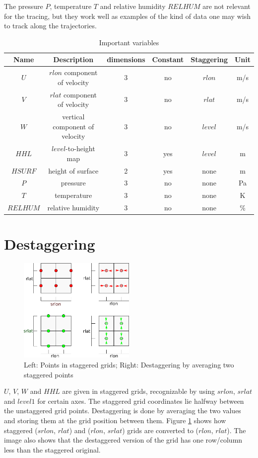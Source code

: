 The pressure $P$, temperature $T$ and relative humidity $RELHUM$ are not relevant for the tracing, but they work well as examples of the kind of data one may wish to track along the trajectories.

\begin{table}
\centering
\begin{tabular}{|c|c|c|c|c|c|}
\hline
Name & Description & dimensions & Constant & Staggering & Unit \\ \hline
$U$ & $rlon$ component of velocity & 3 & no & $rlon$ & m/s \\ \hline
$V$ & $rlat$ component of velocity & 3 & no & $rlat$ & m/s \\ \hline
$W$ & vertical component of velocity & 3 & no & $level$ & m/s \\ \hline
$HHL$ & $level$-to-height map & 3 & yes & $level$ & m \\ \hline
$HSURF$ & height of surface & 2 & yes & none & m \\ \hline
$P$ & pressure & 3 & no & none & Pa \\ \hline
$T$ & temperature & 3 & no & none & K \\ \hline
$RELHUM$ & relative humidity & 3 & no & none & \% \\ \hline
\end{tabular}
\caption{Important variables}
\label{tab:variables}
\end{table}

\section{Destaggering}\label{sec:destaggering}
\begin{figure}
\centering \includegraphics*[width=0.5\textwidth]{figures/0613_staggering}
\caption{Left: Points in staggered grids; Right: Destaggering by averaging two staggered points}
\label{fig:destaggering}
\end{figure}
$U$, $V$, $W$ and $HHL$ are given in staggered grids, recognizable by using $srlon$, $srlat$ and $level1$ for certain axes. The staggered grid coordinates lie halfway between the unstaggered grid points. Destaggering is done by averaging the two values and storing them at the grid position between them. Figure \ref{fig:destaggering} shows how staggered ($srlon$, $rlat$) and ($rlon$, $srlat$) grids are converted to ($rlon$, $rlat$). The image also shows that the destaggered version of the grid has one row/column less than the staggered original.


